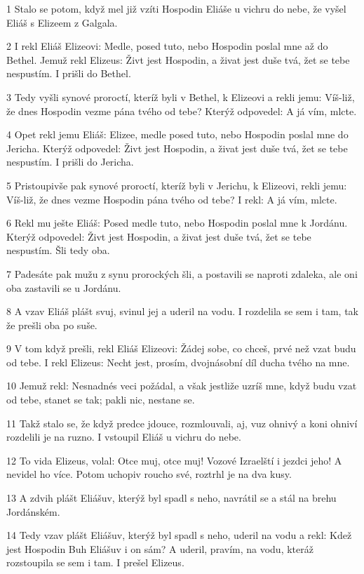 \par 1 Stalo se potom, když mel již vzíti Hospodin Eliáše u vichru do nebe, že vyšel Eliáš s Elizeem z Galgala.
\par 2 I rekl Eliáš Elizeovi: Medle, posed tuto, nebo Hospodin poslal mne až do Bethel. Jemuž rekl Elizeus: Živt jest Hospodin, a živat jest duše tvá, žet se tebe nespustím. I prišli do Bethel.
\par 3 Tedy vyšli synové proroctí, kteríž byli v Bethel, k Elizeovi a rekli jemu: Víš-liž, že dnes Hospodin vezme pána tvého od tebe? Kterýž odpovedel: A já vím, mlcte.
\par 4 Opet rekl jemu Eliáš: Elizee, medle posed tuto, nebo Hospodin poslal mne do Jericha. Kterýž odpovedel: Živt jest Hospodin, a živat jest duše tvá, žet se tebe nespustím. I prišli do Jericha.
\par 5 Pristoupivše pak synové proroctí, kteríž byli v Jerichu, k Elizeovi, rekli jemu: Víš-liž, že dnes vezme Hospodin pána tvého od tebe? I rekl: A já vím, mlcte.
\par 6 Rekl mu ješte Eliáš: Posed medle tuto, nebo Hospodin poslal mne k Jordánu. Kterýž odpovedel: Živt jest Hospodin, a živat jest duše tvá, žet se tebe nespustím. Šli tedy oba.
\par 7 Padesáte pak mužu z synu prorockých šli, a postavili se naproti zdaleka, ale oni oba zastavili se u Jordánu.
\par 8 A vzav Eliáš plášt svuj, svinul jej a uderil na vodu. I rozdelila se sem i tam, tak že prešli oba po suše.
\par 9 V tom když prešli, rekl Eliáš Elizeovi: Žádej sobe, co chceš, prvé než vzat budu od tebe. I rekl Elizeus: Necht jest, prosím, dvojnásobní díl ducha tvého na mne.
\par 10 Jemuž rekl: Nesnadnés veci požádal, a však jestliže uzríš mne, když budu vzat od tebe, stanet se tak; pakli nic, nestane se.
\par 11 Takž stalo se, že když predce jdouce, rozmlouvali, aj, vuz ohnivý a koni ohniví rozdelili je na ruzno. I vstoupil Eliáš u vichru do nebe.
\par 12 To vida Elizeus, volal: Otce muj, otce muj! Vozové Izraelští i jezdci jeho! A nevidel ho více. Potom uchopiv roucho své, roztrhl je na dva kusy.
\par 13 A zdvih plášt Eliášuv, kterýž byl spadl s neho, navrátil se a stál na brehu Jordánském.
\par 14 Tedy vzav plášt Eliášuv, kterýž byl spadl s neho, uderil na vodu a rekl: Kdež jest Hospodin Buh Eliášuv i on sám? A uderil, pravím, na vodu, kteráž rozstoupila se sem i tam. I prešel Elizeus.
